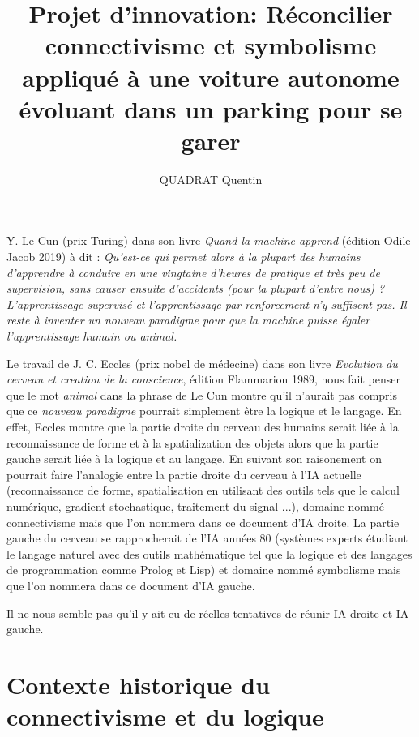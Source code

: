 \documentclass[french, a4paper, 10pt]{article}
\title{Projet d'innovation: Réconcilier connectivisme et symbolisme appliqué à une
  voiture autonome évoluant dans un parking pour se garer}
\author{QUADRAT Quentin}
\begin{document}
\maketitle

Y. Le Cun (prix Turing) dans son livre \emph{Quand la machine apprend} (édition
Odile Jacob 2019) à dit : \emph{Qu'est-ce qui permet alors à la plupart des
humains d'apprendre à conduire en une vingtaine d'heures de pratique et très peu
de supervision, sans causer ensuite d'accidents (pour la plupart d'entre nous) ?
L'apprentissage supervisé et l'apprentissage par renforcement n'y suffisent
pas. Il reste à inventer un nouveau paradigme pour que la machine puisse égaler
l'apprentissage humain ou animal.}

Le travail de J. C. Eccles (prix nobel de médecine) dans son livre
\emph{Evolution du cerveau et creation de la conscience}, édition Flammarion
1989, nous fait penser que le mot \emph{animal} dans la phrase de Le Cun montre
qu'il n'aurait pas compris que ce \emph{nouveau paradigme} pourrait simplement
être la logique et le langage. En effet, Eccles montre que la partie droite du
cerveau des humains serait liée à la reconnaissance de forme et à la
spatialization des objets alors que la partie gauche serait liée à la logique et
au langage. En suivant son raisonement on pourrait faire l'analogie entre la
partie droite du cerveau à l'IA actuelle (reconnaissance de forme,
spatialisation en utilisant des outils tels que le calcul numérique, gradient
stochastique, traitement du signal ...), domaine nommé connectivisme mais que
l'on nommera dans ce document d'IA droite. La partie gauche du cerveau se
rapprocherait de l'IA années 80 (systèmes experts étudiant le langage naturel
avec des outils mathématique tel que la logique et des langages de programmation
comme Prolog et Lisp) et domaine nommé symbolisme mais que l'on nommera dans ce
document d'IA gauche.

Il ne nous semble pas qu'il y ait eu de réelles tentatives de réunir IA droite
et IA gauche.

\section{Contexte historique du connectivisme et du logique}
\end{document}
